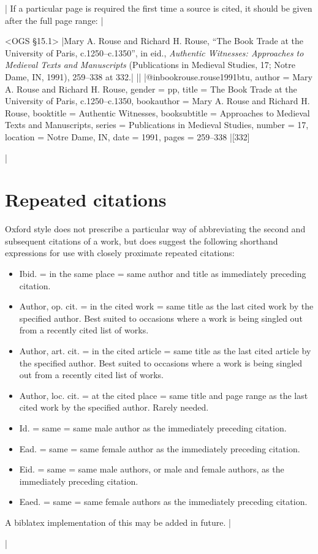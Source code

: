 \documentclass[extrafontsizes,11pt,a4paper,oneside]{memoir}
\begin{document}
\todoc[oxnotes]|
If a particular page is required the first time a source is cited, it should be given after the full page range:
|

\bibexample<OGS \S15.1>
|Mary A. Rouse and Richard H. Rouse, \enquote{The Book Trade at the University of Paris, c.1250--c.1350}, in eid., \emph{Authentic Witnesses: Approaches to Medieval Texts and Manuscripts} (Publications in Medieval Studies, 17; Notre Dame, IN, 1991), 259--338 at 332.|%
||%
|@inbook{rouse.rouse1991btu,
  author = {Mary A. Rouse and Richard H. Rouse},
  gender = {pp},
  title = {The Book Trade at the University of Paris, c.1250--c.1350},
  bookauthor = {Mary A. Rouse and Richard H. Rouse},
  booktitle = {Authentic Witnesses},
  booksubtitle = {Approaches to Medieval Texts and Manuscripts},
  series = {Publications in Medieval Studies},
  number = {17},
  location = {Notre Dame, IN},
  date = {1991},
  pages = {259--338}
}|[332]

\todoc[oxnotes]|
\section{Repeated citations}

Oxford style does not prescribe a particular way of abbreviating the second and subsequent citations of a work, but does suggest the following shorthand expressions for use with closely proximate repeated citations:

\begin{itemize}
  \item Ibid. = in the same place = same author and title as immediately preceding citation.
  \item Author, op. cit. = in the cited work = same title as the last cited work by the specified author. Best suited to occasions where a work is being singled out from a recently cited list of works. 
  \item Author, art. cit. = in the cited article = same title as the last cited article by the specified author. Best suited to occasions where a work is being singled out from a recently cited list of works.
  \item Author, loc. cit. = at the cited place = same title and page range as the last cited work by the specified author. Rarely needed.
  \item Id. = same = same male author as the immediately preceding citation.
  \item Ead. = same = same female author as the immediately preceding citation.
  \item Eid. = same = same male authors, or male and female authors, as the immediately preceding citation.
  \item Eaed. = same = same female authors as the immediately preceding citation.
\end{itemize}

A \textsf{biblatex} implementation of this may be added in future.
|


\todoc|
\printbibliography[notcategory=reviewed]
\end{document}
